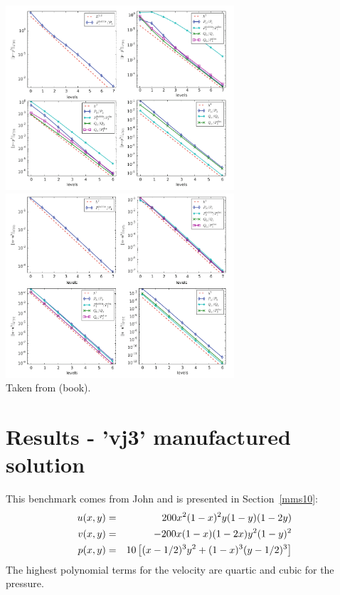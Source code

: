 \begin{center} 
\includegraphics[width=8.5cm]{python_codes/fieldstone_120/images/john_a}
\includegraphics[width=8.5cm]{python_codes/fieldstone_120/images/john_b}\\
{\captionfont Taken from \textcite{john16} (book).}
\end{center} 




\newpage
\section*{Results - 'vj3' manufactured solution}

This benchmark comes from John \etal \cite{jolm17} and is presented in Section~\ref{mms10}:
\begin{eqnarray}
u(x,y) &=& 200x^2(1-x)^2y(1-y)(1-2y) \nonumber\\
v(x,y) &=& -200x(1-x)(1-2x)y^2(1-y)^2 \nonumber\\
p(x,y) &=& 10\left[(x-1/2)^3y^2+(1-x)^3(y-1/2)^3 \right] \nonumber
\end{eqnarray}
The highest polynomial terms for the velocity are quartic and cubic for the pressure.


